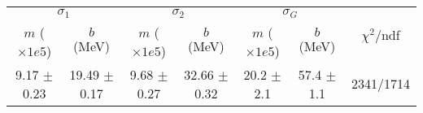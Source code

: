 \begin{tabular}{cc|cc|cc||c}
\multicolumn{2}{c|}{$\sigma_1$} & \multicolumn{2}{|c}{$\sigma_2$} & \multicolumn{2}{|c}{$\sigma_G$}  & \multirow{2}{*}{$\chi^2/$ndf}\\
$m$ ($\times1e5$) & $b$ (MeV) & $m$ ($\times1e5$) & $b$ (MeV) & $m$ ($\times1e5$) & $b$ (MeV) & \\
\hline
9.17 $\pm$ 0.23 & 19.49 $\pm$ 0.17 & 9.68 $\pm$ 0.27 & 32.66 $\pm$ 0.32 & 20.2 $\pm$ 2.1 & 57.4 $\pm$ 1.1 & 2341/1714\\
\end{tabular}

